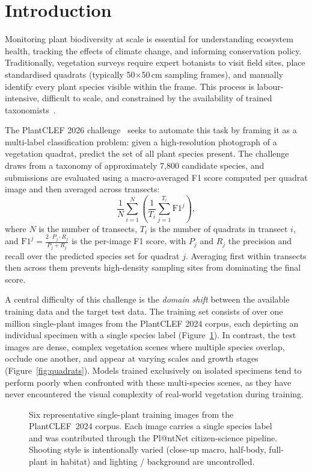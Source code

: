 \section{Introduction}
\label{sec:introduction}

Monitoring plant biodiversity at scale is essential for understanding ecosystem health, tracking the effects of climate change, and informing conservation policy. Traditionally, vegetation surveys require expert botanists to visit field sites, place standardised quadrats (typically 50$\times$50\,cm sampling frames), and manually identify every plant species visible within the frame. This process is labour-intensive, difficult to scale, and constrained by the availability of trained taxonomists~\cite{joly2024overview}.

The PlantCLEF 2026 challenge~\cite{plantclef2026} seeks to automate this task by framing it as a multi-label classification problem: given a high-resolution photograph of a vegetation quadrat, predict the set of all plant species present. The challenge draws from a taxonomy of approximately 7,800 candidate species, and submissions are evaluated using a macro-averaged F1 score computed 
per quadrat image and then averaged across transects:
\[
  \frac{1}{N}\sum_{i=1}^{N}\!\left(\frac{1}{T_i}
  \sum_{j=1}^{T_i}\mathrm{F1}^{j}\right),
\]
where $N$ is the number of transects, $T_i$ is the number of quadrats 
in transect $i$, and $\mathrm{F1}^{j} = \frac{2 \cdot P_j \cdot R_j}{P_j + R_j}$ 
is the per-image F1 score, with $P_j$ and $R_j$ the precision and 
recall over the predicted species set for quadrat $j$. Averaging first 
within transects then across them prevents high-density sampling sites 
from dominating the final score.

A central difficulty of this challenge is the \emph{domain shift} between the available training data and the target test data. The training set consists of over one million single-plant images from the PlantCLEF 2024 corpus, each depicting an individual specimen with a single species label (Figure~\ref{fig:train_grid}). In contrast, the test images are dense, complex vegetation scenes where multiple species overlap, occlude one another, and appear at varying scales and growth stages (Figure~\ref{fig:quadrats}). Models trained exclusively on isolated specimens tend to perform poorly when confronted with these multi-species scenes, as they have never encountered the visual complexity of real-world vegetation during training.

\begin{figure}[h]
  \centering
  \resizebox{0.92\linewidth}{!}{}
  \caption{Six representative single-plant training images from the PlantCLEF~2024 corpus. Each image carries a single species label and was contributed through the Pl@ntNet citizen-science pipeline. Shooting style is intentionally varied (close-up macro, half-body, full-plant in habitat) and lighting / background are uncontrolled.}
  \label{fig:train_grid}
\end{figure}

